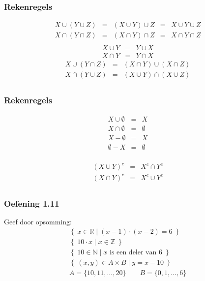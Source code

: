 \documentclass[dutch]{../khlslides}
\newcommand{\union}{\cup}
\newcommand{\intersect}{\cap}
\begin{document}
\begin{frame}
  \frametitle{Rekenregels}
  \[
    \begin{array}{rclclr}
      X \union (Y \union Z) & = & (X \union Y) \union Z & = & X \union Y \union Z \\
      X \intersect (Y \intersect Z) & = & (X \intersect Y) \intersect Z & = & X \intersect Y \intersect Z \\
    \end{array}
  \]
  \[
    \begin{array}{rcl}
      X \union Y & = & Y \union X \\
      X \intersect Y & = & Y \intersect X
    \end{array}
  \]
  \[
    \begin{array}{rcl}
      X \union (Y \intersect Z) & = & (X \intersect Y) \union (X \intersect Z) \\
      X \intersect (Y \union Z) & = & (X \union Y) \intersect (X \union Z) \\
    \end{array}
  \]
\end{frame}

\begin{frame}
  \frametitle{Rekenregels}
  \[
    \begin{array}{rclclr}
      X \union \emptyset & = & X \\
      X \intersect \emptyset & = & \emptyset \\
      X - \emptyset & = & X \\
      \emptyset - X & = & \emptyset \\
    \end{array}
  \]

  \[
    \begin{array}{rclclr}
      (X \union Y)^c & = & X^c \intersect Y^c \\
      (X \intersect Y)^c & = & X^c \union Y^c \\
    \end{array}
  \]
\end{frame}

\begin{frame}
  \frametitle{Oefening 1.11}
  Geef door opsomming:
  \[
    \begin{array}{c}
      \left\{ \; x \in \mathbb{R} \;|\; (x-1) \cdot (x-2) = 6 \; \right\} \\[1cm]
      \left\{ \; 10\cdot x \;|\; x \in \mathbb{Z} \; \right\} \\[1cm]
      \left\{ \; 10 \in \mathbb{N} \;|\; x \textrm{ is een deler van 6} \; \right\} \\[1cm]
      \left\{ \; (x, y) \in A \times B \;|\; y = x - 10 \; \right\} \\ A = \{10,11,\dots,20\} \qquad B = \{0,1,\dots,6\}
    \end{array}
  \]
\end{frame}
\end{document}
